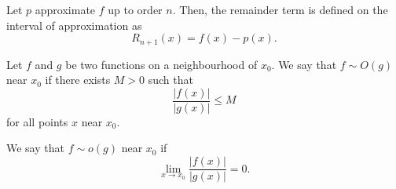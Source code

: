 \documentclass[11pt]{article}
\theoremstyle{definition}
\theoremstyle{remark}
\numberwithin{equation}{module}
\begin{document}
    \begin{definition}[Remainder]
        Let $p$ approximate $f$ up to order $n$. Then, the remainder term is defined
        on the interval of approximation as \[
            R_{n + 1}(x) = f(x) - p(x).
        \] 
    \end{definition}

    \begin{definition}
        Let $f$ and $g$ be two functions on a neighbourhood of $x_0$. We say that $f
        \sim O(g)$ near $x_0$ if there exists $M > 0$ such that \[
            \frac{|f(x)|}{|g(x)|} \leq M
        \] for all points $x$ near $x_0$.

        We say that $f \sim o(g)$ near $x_0$ if \[
            \lim_{x \to x_0} \frac{|f(x)|}{|g(x)|} = 0.
        \] 
    \end{definition}
\end{document}
